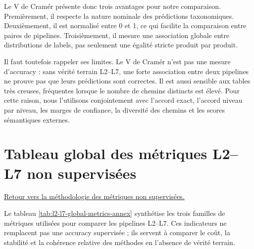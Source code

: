 \documentclass[12pt,a4paper]{report}
\begin{document}
Le V de Cramér présente donc trois avantages pour notre comparaison. Premièrement, il respecte la nature nominale des prédictions taxonomiques. Deuxièmement, il est normalisé entre 0 et 1, ce qui facilite la comparaison entre paires de pipelines. Troisièmement, il mesure une association globale entre distributions de labels, pas seulement une égalité stricte produit par produit.

Il faut toutefois rappeler ses limites. Le V de Cramér n'est pas une mesure d'accuracy : sans vérité terrain L2--L7, une forte association entre deux pipelines ne prouve pas que leurs prédictions sont correctes. Il est aussi sensible aux tables très creuses, fréquentes lorsque le nombre de chemins distincts est élevé. Pour cette raison, nous l'utilisons conjointement avec l'accord exact, l'accord niveau par niveau, les marges de confiance, la diversité des chemins et les scores sémantiques externes.

\section*{Tableau global des métriques L2--L7 non supervisées}
\label{sec:l2-l7-metrics-annex}

\noindent\hyperref[sec:l2-l7-unsupervised-metrics]{Retour vers la méthodologie des métriques non supervisées.}

Le tableau \ref{tab:l2-l7-global-metrics-annex} synthétise les trois familles de métriques utilisées pour comparer les pipelines L2--L7. Ces indicateurs ne remplacent pas une accuracy supervisée ; ils servent à comparer le coût, la stabilité et la cohérence relative des méthodes en l'absence de vérité terrain.
\end{document}
